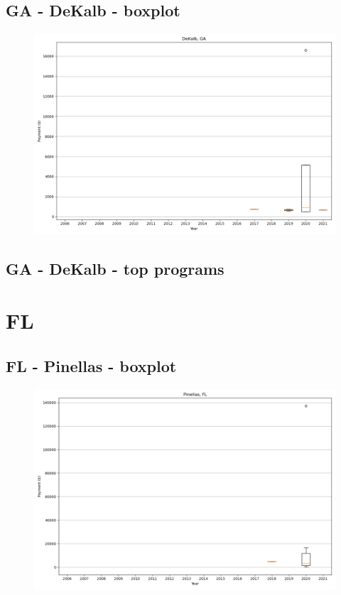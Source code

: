 \subsection*{GA - DeKalb - boxplot}
\begin{figure}[h]
\centering
\includegraphics[width=7in]{../output/boxplots/counties/DeKalb-GA_boxplot.png}
\end{figure}


\subsection*{GA - DeKalb - top programs}

\newpage
\section*{FL}
\subsection*{FL - Pinellas - boxplot}
\begin{figure}[h]
\centering
\includegraphics[width=7in]{../output/boxplots/counties/Pinellas-FL_boxplot.png}
\end{figure}


